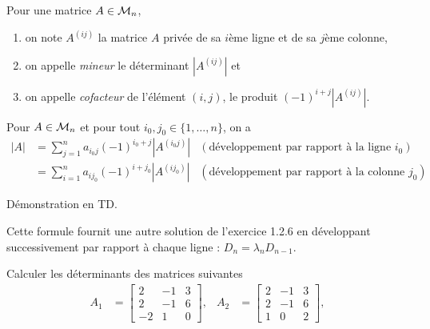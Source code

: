 \begin{definition*}
  Pour une matrice $A \in \mathcal{M}_n$, 
  \begin{enumerate}[\itemdot]
   \item on note $A^{(ij)}$ la matrice $A$ privée de sa $i$ème ligne et de sa $j$ème colonne,
   \item on appelle {\em mineur} le déterminant $|A^{(ij)}|$ et
   \item on appelle {\em cofacteur} de l'élément $(i, j)$, le produit $(-1)^{i+j} |A^{(ij)}|$.
  \end{enumerate}
\end{definition*}

\begin{proposition*}
  Pour $A \in \mathcal{M}_n$ et pour tout $i_0, j_0 \in \{1, \dots, n\}$, on a 
  \begin{align*}
    |A| 
    & = \sum_{j=1}^n a_{i_0j} (-1)^{i_0+j} |A^{(i_0j)}| & (\text{développement par rapport à la ligne $i_0$}) \\
    & = \sum_{i=1}^n a_{ij_0} (-1)^{i+j_0} |A^{(ij_0)}| & (\text{développement par rapport à la colonne $j_0$})
  \end{align*}
\end{proposition*}

\proof Démonstration en TD. \eproof

\remark Cette formule fournit une autre solution de l'exercice 1.2.6 en développant successivement par rapport à chaque ligne : $D_n = \lambda_n D_{n-1}$.

\begin{exercise*}
  Calculer les déterminants des matrices suivantes 
  \begin{align*}
    A_1 & = \left[\begin{array}{rrr}
      2 & -1 & 3 \\ 2 & -1 & 6 \\ -2 & 1 & 0
      \end{array}\right], &
    A_2 & = \left[\begin{array}{rrr}
      2 & -1 & 3 \\ 2 & -1 & 6 \\ 1 & 0  & 2
      \end{array}\right], \\
  \end{align*}
\end{exercise*}

